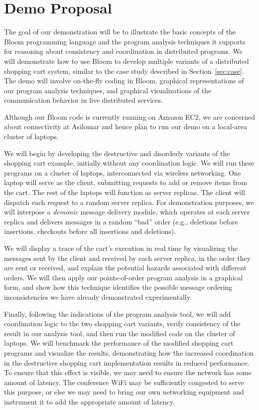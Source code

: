 \clearpage
\section{Demo Proposal}
\label{sec:demo}

The goal of our demonstration will be to illustrate the basic concepts of the
Bloom programming language and the program analysis techniques it supports for reasoning about consistency and coordination in distributed programs.
We will
demonstrate how to use Bloom to develop multiple variants of a distributed
shopping cart system, similar to the case study described in
Section~\ref{sec:case}.  The demo will involve on-the-fly coding in Bloom, graphical representations of our program analysis techniques, and graphical visualizations of the communication behavior in live distributed services.

Although our Bloom code is currently running on Amazon EC2, we are concerned about connectivity at Asilomar and hence plan to run our demo on a local-area cluster of laptops.

We will begin by developing the destructive and disorderly variants of the
shopping cart example, initially without any coordination logic. We will run
these programs on a cluster of laptops, interconnected via wireless
networking. One laptop will serve as the client, submitting requests to add or
remove items from the cart.  The rest of the laptops will function as server
replicas.  The client will dispatch each request to a random server replica.
For demonstration purposes, we will interpose a \emph{demonic} message delivery module,
which operates at each server replica and delivers messages in a random ``bad''
order (e.g., deletions before insertions, checkouts before all insertions
and deletions).

We will display a trace of the cart's execution in real time by visualizing the
messages sent by the client and received by each server replica, in the order
they are sent or received, and explain the potential hazards associated with
different orders. We will then apply our points-of-order program analysis in a graphical form, 
and show how this technique identifies the possible message ordering inconsistencies
we have already demonstrated experimentally.

Finally, following the indications of the program analysis tool, we will add 
coordination logic to the two shopping cart variants, verify consistency of the result in our analysis tool, and
then run the modified code on the cluster of laptops. We will benchmark the
performance of the modified shopping cart programs and visualize the results,
demonstrating how the increased coordination in the destructive shopping cart
implementation results in reduced performance. To ensure that this effect is
visible, we may need to ensure the network has some amount of latency. The
conference WiFi may be sufficiently congested to serve this purpose, or else we
may need to bring our own networking equipment and instrument it to add the
appropriate amount of latency.
